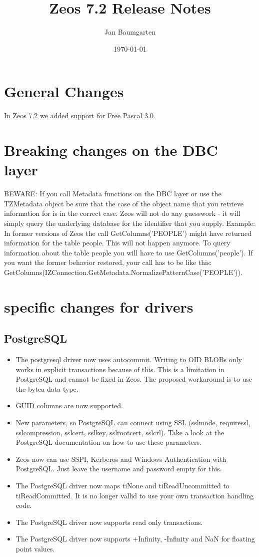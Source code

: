 \documentclass[a4paper,12pt,oneside]{article}
\title{Zeos 7.2 Release Notes}
\author{Jan Baumgarten}
\date{\today}
\begin{document}
\maketitle

\section{General Changes}
In Zeos 7.2 we added support for Free Pascal 3.0.

\section{Breaking changes on the DBC layer}
BEWARE: If you call Metadata functions on the DBC layer or use the TZMetadata object be sure that the case of the object name that you retrieve information for is in the correct case.
Zeos will not do any guesswork - it will simply query the underlying database for the identifier that you supply.
Example: In former versions of Zeos the call GetColumns('PEOPLE') might have returned information for the table people.
This will not happen anymore.
To query information about the table people you will have to use GetColumns('people').
If you want the former behavior restored, your call has to be like this:
GetColumns(IZConnection.GetMetadata.NormalizePatternCase('PEOPLE')).

\section{specific changes for drivers}
\subsection{PostgreSQL}
\begin{itemize}
\item The postgresql driver now uses autocommit. Writing to OID BLOBs only works in explicit transactions because of this. 
This is a limitation in PostgreSQL and cannot be fixed in Zeos. The proposed workaround is to use the bytea data type.
\item GUID columns are now supported.
\item 
  New parameters, so PostgreSQL can connect using SSL (sslmode, requiressl, sslcompression, sslcert, sslkey, sslrootcert, sslcrl). 
	Take a look at the PostgreSQL documentation on how to use these parameters.
\item
  Zeos now can use SSPI, Kerberos and Windows Authentication with PostgreSQL.
	Just leave the username and password empty for this.
\item
  The PostgreSQL driver now maps tiNone and tiReadUncommitted to tiReadCommitted.
	It is no longer vallid to use your own transaction handling code.
\item
  The PostgreSQL driver now supports read only transactions.
\item
  The PostgreSQL driver now supports +Infinity, -Infinity and NaN for floating point values.
\end{itemize}
\end{document}

